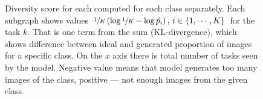 \begin{figure}[t!]
	\centering
	 \hfill
	\hfill
	\caption{Diversity score for each computed for each class separately. Each subgraph shows values $\sfrac1K \left(\log\sfrac1K - \log\hat{p_i}\right), \, i \in \{1, \cdots, K\}$ for the task $k$. That is one term from the sum (KL-divergence), which shows difference between ideal and generated proportion of images for a specific class. On the $x$ axis there is total number of tasks seen by the model. Negative value means that model generates too many images of the class, positive --- not enough images from the given class. }\label{fig:online:Div_pertask}
\end{figure}

